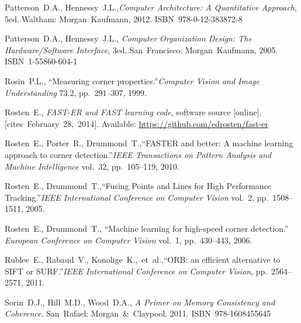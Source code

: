 {\begin{thebibliography}{99}
			Patterson~D.A., Hennessy~J.L.,\linebreak[1]
			\textit{Computer Architecture: A Quantitative Approach},
				5\nth ed..\linebreak[1]
			Waltham: Morgan~Kaufmann, 2012. ISBN~978-0-12-383872-8
		
			Patterson~D.A., Hennessy~J.L., \linebreak[1]
			\textit{Computer Organization Design: %
				The Hardware/Software Interface}, 3\rd ed..\linebreak[1]
			San~Francisco: Morgan~Kaufmann, 2005. ISBN~1-55860-604-1
		
			Rosin~P.L.,
			``Measuring corner properties.''\linebreak[1]
			\textit{Computer Vision and Image Understanding} 73.2,
			pp.~291--307, 1999.
		
			Rosten~E.,
			\textit{FAST-ER and FAST learning code},
			software source [online], [cites~February~28,~2014].
			Available: \url{https://github.com/edrosten/fast-er}
		
			Rosten~E., Porter~R., Drummond~T.,\linebreak[1]
			``FASTER and better: A machine learning approach to corner detection.''\linebreak[1]
			\textit{IEEE Transactions on Pattern Analysis and Machine Intelligence} vol.~32,
			pp.~105--119, 2010.
		
			Rosten~E., Drummond~T.,\linebreak[1]
			``Fusing Points and Lines for High Performance Tracking.''\linebreak[1]
			\textit{IEEE International Conference on Computer Vision} vol.~2,
			pp.~1508--1511, 2005.
		
			Rosten~E., Drummond~T.,
			``Machine learning for high-speed corner detection.''
			\textit{European Conference on Computer Vision} vol.~1, pp.~430--443,
			2006.
		
			Rublee~E., Rabaud~V., Konolige~K.,~et~al.,\linebreak[1]
			``ORB: an efficient alternative to SIFT or SURF.''\linebreak[1]
			\textit{IEEE International Conference on Computer Vision},
			pp.~2564--2571, 2011.
		
			Sorin~D.J., Hill~M.D., Wood~D.A.,
			\textit{A Primer on Memory Consistency and Coherence}.
			San~Rafael: Morgan~\&~Claypool, 2011. ISBN~978-1608455645
		

\end{thebibliography}}
